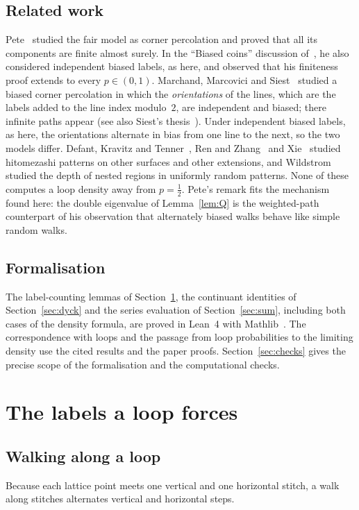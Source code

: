 \documentclass[11pt]{amsart}
\theoremstyle{definition}
\theoremstyle{remark}
\begin{document}
\subsection*{Related work}
Pete~\cite{Pet08} studied the fair model as corner percolation and proved that all its components are
finite almost surely. In the ``Biased coins'' discussion of~\cite[Section~7]{Pet08}, he also considered
independent biased labels, as here, and observed that his finiteness proof extends to every
$p\in(0,1)$. Marchand, Marcovici and Siest~\cite{MMS25} studied a biased corner percolation in which the
\emph{orientations} of the lines, which are the labels added to the line index modulo~$2$, are
independent and biased; there infinite paths appear (see also Siest's thesis~\cite{Sie24}). Under
independent biased labels, as here, the orientations alternate in bias from one line to the next, so
the two models differ. Defant, Kravitz and Tenner~\cite{DKT23}, Ren and Zhang~\cite{RZ25} and
Xie~\cite{Xie25} studied hitomezashi patterns on other surfaces and other extensions, and
Wildstrom~\cite{Wil24} studied the depth of nested regions in uniformly random patterns. None of these
computes a loop density away from $p=\tfrac12$. Pete's remark fits the mechanism found here: the double
eigenvalue of Lemma~\ref{lem:Q} is the weighted-path counterpart of his observation that alternately
biased walks behave like simple random walks.

\subsection*{Formalisation}
The label-counting lemmas of Section~\ref{sec:labels}, the continuant identities of
Section~\ref{sec:dyck} and the series evaluation of Section~\ref{sec:sum}, including both cases of the
density formula, are proved in Lean~4 with Mathlib~\cite{Mathlib}. The correspondence with loops and
the passage from loop probabilities to the limiting density use the cited results and the paper
proofs. Section~\ref{sec:checks} gives the precise scope of the formalisation and the computational
checks.

\section{The labels a loop forces}\label{sec:labels}

\subsection{Walking along a loop}
Because each lattice point meets one vertical and one horizontal stitch, a walk along stitches
alternates vertical and horizontal steps.
\end{document}
